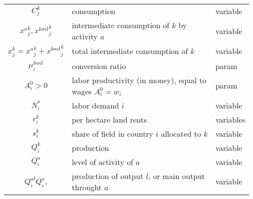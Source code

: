 \begin{table}[h!]
\begin{tabular}{c|l|l}
        $C_j^k$                                     & consumption                                                        & variable                          \\

        ${x^a}_j^k, {x^\text{feed}}_j^k$            & intermediate consumption of $k$ by activity $a$                    & variable                          \\

        ${x}_j^k = {x^a}_j^k + {x^\text{feed}}_j^k$ & total intermediate consumption of $k$                              & variable                          \\

        ${\mu_i^\text{feed}}$                       & conversion ratio                                                   & param                             \\

        $A_i^0 > 0$                                 & labor productivity (in money), equal to wages $A_i^0 = w_i$        & param                             \\

        $N_i^*$                                     & labor demand $i$                                                   & variable                          \\

        $r_i^k$                                     & per hectare land rents                                             & variables                         \\

        $s_i^k$                                     & share of field in country $i$ allocated to $k$                     & variable                          \\

        $Q_i^k$                                     & production                                                         & variable                          \\

        $Q_i^a$                                     & level of activity of $a$                                           & variable                          \\

        $Q_i^{al} Q_i^{a}$,                         & production of output $l$, or main output throught $a$              & variable                          \\


\end{tabular}
\end{table}
